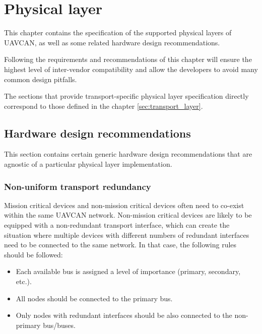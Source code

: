 \chapter{Physical layer}\label{sec:physical_layer}

This chapter contains the specification of the supported physical layers of UAVCAN,
as well as some related hardware design recommendations.

Following the requirements and recommendations of this chapter will ensure the highest level of
inter-vendor compatibility and allow the developers to avoid many common design pitfalls.

The sections that provide transport-specific physical layer specification
directly correspond to those defined in the chapter \ref{sec:transport_layer}.

\clearpage

\clearpage
\section{Hardware design recommendations}

This section contains certain generic hardware design recommendations that are agnostic of a particular
physical layer implementation.

\subsection{Non-uniform transport redundancy}\label{sec:phy_non_uniform_transport_redundancy}

Mission critical devices and non-mission critical devices often need to co-exist within the same UAVCAN network.
Non-mission critical devices are likely to be equipped with a non-redundant transport interface,
which can create the situation where multiple devices with different numbers of redundant interfaces
need to be connected to the same network.
In that case, the following rules should be followed:

\begin{itemize}
    \item Each available bus is assigned a level of importance (primary, secondary, etc.).
    \item All nodes should be connected to the primary bus.
    \item Only nodes with redundant interfaces should be also connected to the non-primary bus/buses.
\end{itemize}

